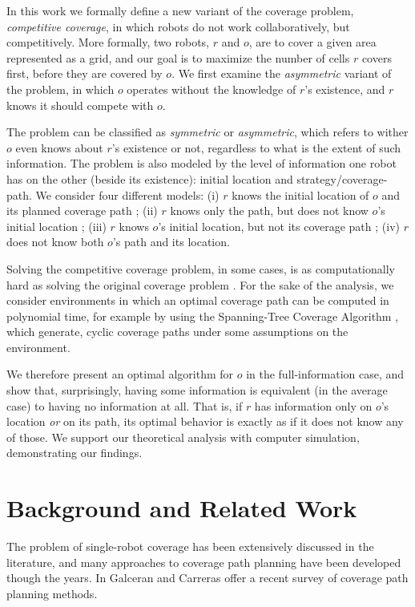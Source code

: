 \documentclass[a4paper,english,10pt]{article}
\newcommand\rob{\ensuremath{r}\xspace}
\newcommand\opp{\ensuremath{o}\xspace}
\begin{document}
In this work we formally define a new variant of the coverage problem, {\em competitive coverage}, in which robots do not work collaboratively, but competitively. More formally, two robots, \rob and \opp, are to cover a given area represented as a grid, and our goal is to maximize the number of cells \rob covers first, before they are covered by \opp. We first examine the {\em asymmetric} variant of the problem, in which \opp operates without the knowledge of \rob's existence, and \rob knows it should compete with \opp. 

The problem can be classified as {\em symmetric} or {\em asymmetric}, which refers to wither \opp even knows about \rob's existence or not, regardless to what is the extent of such information. The problem is also modeled by the level of information one robot has on the other (beside its existence): initial location and strategy/coverage-path. We consider four different models: (i) \rob knows the initial location of \opp and its planned coverage path ; (ii) \rob knows only the path, but does not know \opp's initial location ; (iii) \rob knows \opp's initial location, but not its coverage path ; (iv) \rob does not know both \opp's path and its location.

Solving the competitive coverage problem, in some cases, is as computationally hard as solving the original coverage problem \cite{arkin2000approximation}. For the sake of the analysis, we consider environments in which an optimal coverage path can be computed in polynomial time, for example by using the Spanning-Tree Coverage Algorithm \cite{gabriely2001spanning}, which generate, cyclic coverage paths under some assumptions on the environment. 

We therefore present an optimal algorithm for \opp in the full-information case, and show that, surprisingly, having some information is equivalent (in the average case) to having no information at all. That is, if \rob has information only on \opp's location {\em or} on its path, its optimal behavior is exactly as if it does not know any of those. We support our theoretical analysis with computer simulation, demonstrating our findings. 

\section{Background and Related Work}

The problem of single-robot coverage has been extensively discussed in the literature, and many approaches to coverage path planning have been developed though the years. In \cite{galceran2013survey} Galceran and Carreras offer a recent survey of coverage path planning methods.
\end{document}
